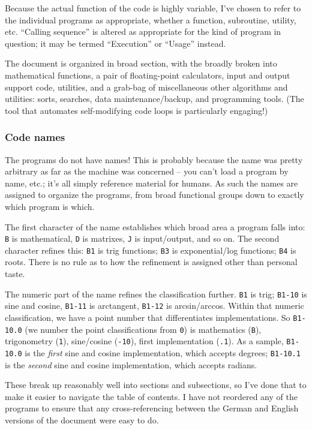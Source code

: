 \documentclass{article}
\begin{document}
Because the actual function of the code is highly variable, I've chosen to refer to the individual programs as appropriate, whether a function, subroutine, utility, etc. ``Calling sequence'' is altered as appropriate for the kind of program in question; it may be termed  ``Execution'' or ``Usage'' instead.

The document is organized in broad section, with the broadly broken into mathematical functions, a pair of floating-point calculators, input and output support code, utilities, and a grab-bag of miscellaneous other algorithms and utilities: sorts, searches, data maintenance/backup, and programming tools. (The tool that automates self-modifying code loops is particularly engaging!)

\subsubsection*{Code names}
The programs do not have names! This is probably because the name was pretty arbitrary as far as the machine was concerned -- you can't load a program by name, etc.; it's all simply reference material for humans.
As such the names are assigned to organize the programs, from broad functional groups down to exactly which program is which.

The first character of the name establishes which broad area a program falls into: \texttt{B} is mathematical, \texttt{D} is matrixes, \texttt{J} is input/output, and so on. The second character refines this: \texttt{B1} is trig functions; \texttt{B3} is exponential/log functions; \texttt{B4} is roots. There is no rule as to how the refinement is assigned other than personal taste.

The numeric part of the name refines the classification further. \texttt{B1} is trig; \texttt{B1-10} is sine and cosine, \texttt{B1-11} is arctangent, \texttt{B1-12} is arcsin/arccos. Within that numeric classification, we have a point number that differentiates implementations. So \texttt{B1-10.0} (we number the point classifications from \texttt{0}) is mathematics (\texttt{B}), trigonometry (\texttt{1}), sine/cosine (\texttt{-10}), first implementation (\texttt{.1}). As a sample,
\texttt{B1-10.0} is the \emph{first} sine and cosine implementation, which accepts degrees; \texttt{B1-10.1} is the \emph{second} sine and cosine implementation, which accepts radians.

These break up reasonably well into sections and subsections, so I've done that to make it easier to navigate the table of contents. I have not reordered any of the programs to ensure that any cross-referencing between the German and English versions of the document were easy to do.
\end{document}
